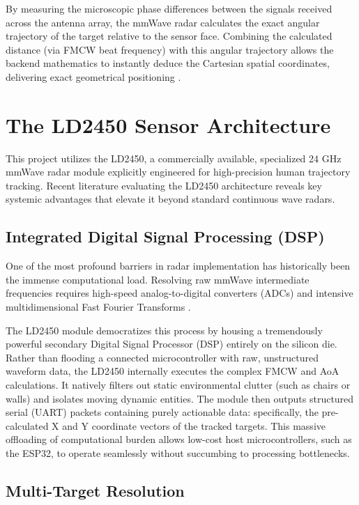By measuring the microscopic phase differences between the signals received across the antenna array, the mmWave radar calculates the exact angular trajectory of the target relative to the sensor face. Combining the calculated distance (via FMCW beat frequency) with this angular trajectory allows the backend mathematics to instantly deduce the Cartesian spatial coordinates, delivering exact geometrical positioning \cite{zheng2019indoor}.

\section{The LD2450 Sensor Architecture}

This project utilizes the LD2450, a commercially available, specialized 24 GHz mmWave radar module explicitly engineered for high-precision human trajectory tracking. Recent literature evaluating the LD2450 architecture reveals key systemic advantages that elevate it beyond standard continuous wave radars.

\subsection{Integrated Digital Signal Processing (DSP)}

One of the most profound barriers in radar implementation has historically been the immense computational load. Resolving raw mmWave intermediate frequencies requires high-speed analog-to-digital converters (ADCs) and intensive multidimensional Fast Fourier Transforms \cite{patole2017automotive}. 

The LD2450 module democratizes this process by housing a tremendously powerful secondary Digital Signal Processor (DSP) entirely on the silicon die. Rather than flooding a connected microcontroller with raw, unstructured waveform data, the LD2450 internally executes the complex FMCW and AoA calculations. It natively filters out static environmental clutter (such as chairs or walls) and isolates moving dynamic entities. The module then outputs structured serial (UART) packets containing purely actionable data: specifically, the pre-calculated X and Y coordinate vectors of the tracked targets. This massive offloading of computational burden allows low-cost host microcontrollers, such as the ESP32, to operate seamlessly without succumbing to processing bottlenecks.

\subsection{Multi-Target Resolution}

